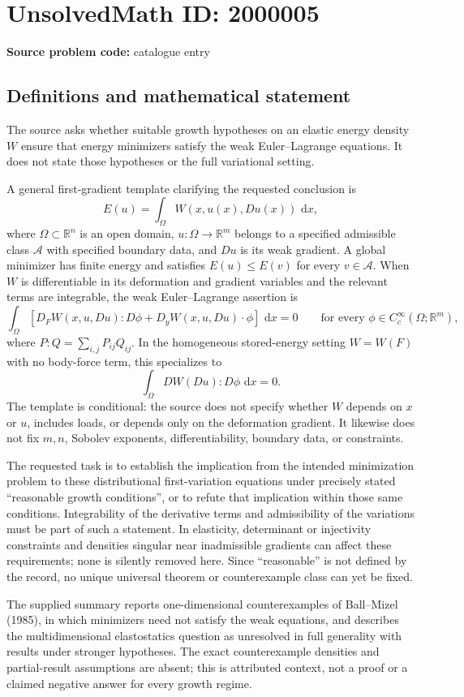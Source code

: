 \documentclass[11pt]{article}
\newcommand{\R}{\mathbb{R}}
\newcommand{\dd}{\,\mathrm{d}}
\begin{document}
\section*{UnsolvedMath ID: 2000005}
\textbf{Source problem code:} catalogue entry
\subsection{Definitions and mathematical statement}
The source asks whether suitable growth hypotheses on an elastic energy density $W$ ensure that energy minimizers satisfy the weak Euler--Lagrange equations. It does not state those hypotheses or the full variational setting.

A general first-gradient template clarifying the requested conclusion is
\[
E(u)=\int_\Omega W(x,u(x),Du(x))\,\dd x,
\]
where $\Omega\subset\R^n$ is an open domain, $u:\Omega\to\R^m$ belongs to a specified admissible class $\mathcal A$ with specified boundary data, and $Du$ is its weak gradient. A global minimizer has finite energy and satisfies $E(u)\le E(v)$ for every $v\in\mathcal A$. When $W$ is differentiable in its deformation and gradient variables and the relevant terms are integrable, the weak Euler--Lagrange assertion is
\[
\int_\Omega \left[D_F W(x,u,Du):D\phi+D_y W(x,u,Du)\cdot\phi\right]\,\dd x=0
\qquad\text{for every }\phi\in C_c^\infty(\Omega;\R^m),
\]
where $P:Q=\sum_{i,j}P_{ij}Q_{ij}$. In the homogeneous stored-energy setting $W=W(F)$ with no body-force term, this specializes to
\[
\int_\Omega D W(Du):D\phi\,\dd x=0.
\]
The template is conditional: the source does not specify whether $W$ depends on $x$ or $u$, includes loads, or depends only on the deformation gradient. It likewise does not fix $m,n$, Sobolev exponents, differentiability, boundary data, or constraints.

The requested task is to establish the implication from the intended minimization problem to these distributional first-variation equations under precisely stated ``reasonable growth conditions'', or to refute that implication within those same conditions. Integrability of the derivative terms and admissibility of the variations must be part of such a statement. In elasticity, determinant or injectivity constraints and densities singular near inadmissible gradients can affect these requirements; none is silently removed here. Since ``reasonable'' is not defined by the record, no unique universal theorem or counterexample class can yet be fixed.

The supplied summary reports one-dimensional counterexamples of Ball--Mizel (1985), in which minimizers need not satisfy the weak equations, and describes the multidimensional elastostatics question as unresolved in full generality with results under stronger hypotheses. The exact counterexample densities and partial-result assumptions are absent; this is attributed context, not a proof or a claimed negative answer for every growth regime.
\end{document}
